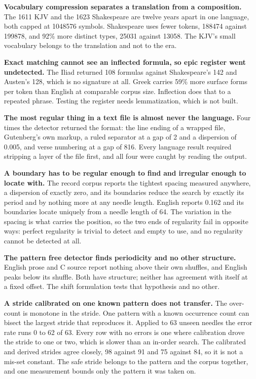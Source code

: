 \textbf{Vocabulary compression separates a translation from a composition.} The 1611 KJV and the 1623 Shakespeare are twelve years apart in one language, both capped at 1048576 symbols. Shakespeare uses fewer tokens, 188474 against 199878, and 92\% more distinct types, 25031 against 13058. The KJV's small vocabulary belongs to the translation and not to the era.

\textbf{Exact matching cannot see an inflected formula, so epic register went undetected.} The Iliad returned 108 formulas against Shakespeare's 142 and Austen's 128, which is no signature at all. Greek carries 59\% more surface forms per token than English at comparable corpus size. Inflection does that to a repeated phrase. Testing the register needs lemmatization, which is not built.

\textbf{The most regular thing in a text file is almost never the language.} Four times the detector returned the format: the line ending of a wrapped file, Gutenberg's own markup, a ruled separator at a gap of 2 and a dispersion of 0.005, and verse numbering at a gap of 816. Every language result required stripping a layer of the file first, and all four were caught by reading the output.

\textbf{A boundary has to be regular enough to find and irregular enough to locate with.} The record corpus reports the tightest spacing measured anywhere, a dispersion of exactly zero, and its boundaries reduce the search by exactly its period and by nothing more at any needle length. English reports 0.162 and its boundaries locate uniquely from a needle length of 64. The variation in the spacing is what carries the position, so the two ends of regularity fail in opposite ways: perfect regularity is trivial to detect and empty to use, and no regularity cannot be detected at all.

\textbf{The pattern free detector finds periodicity and no other structure.} English prose and C source report nothing above their own shuffles, and English peaks below its shuffle. Both have structure; neither has agreement with itself at a fixed offset. The shift formulation tests that hypothesis and no other.

\textbf{A stride calibrated on one known pattern does not transfer.} The over-count is monotone in the stride. One pattern with a known occurrence count can bisect the largest stride that reproduces it. Applied to 63 unseen needles the error rate runs 0 to 62 of 63. Every row with no errors is one where calibration drove the stride to one or two, which is slower than an in-order search. The calibrated and derived strides agree closely, 98 against 91 and 75 against 84, so it is not a mis-set constant. The safe stride belongs to the pattern and the corpus together, and one measurement bounds only the pattern it was taken on.

